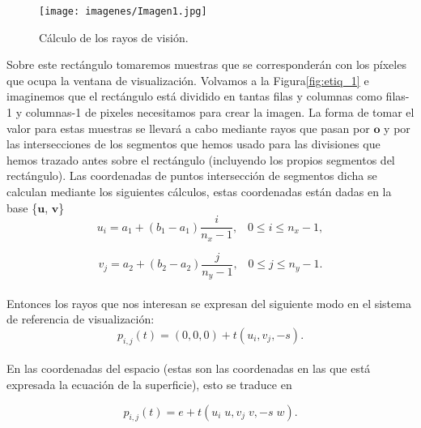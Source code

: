 \begin{figure}
	\begin{center}
		\texttt{[image: imagenes/Imagen1.jpg]}
	\end{center}
	\caption{Cálculo de los rayos de visión.}
	\label{fig:etiq_3}
\end{figure}




Sobre este rectángulo tomaremos muestras que se corresponderán con los píxeles que ocupa la ventana de visualización. Volvamos a la Figura\ref{fig:etiq_1} e imaginemos que el rectángulo está dividido en tantas filas y columnas como filas-1 y columnas-1 de pixeles necesitamos para crear la imagen. La forma de tomar el valor para estas muestras se llevará a cabo mediante rayos que pasan por $\textbf{o}$ y por las intersecciones de los segmentos que hemos usado para las divisiones que hemos trazado antes sobre el rectángulo (incluyendo los propios segmentos del rectángulo). Las coordenadas de puntos intersección de segmentos dicha se calculan mediante los siguientes cálculos, estas coordenadas están dadas en la base \{$\textbf{u}$, $\textbf{v}$\}
${ }$\\


\[
	u_i = a_1 + (b_1-a_1) \frac{i}{n_x-1}, \;\;\; 0 \leq i \leq n_x -1,
\]

\[
	v_j = a_2 + (b_2-a_2) \frac{j}{n_y-1}, \;\;\; 0 \leq j \leq n_y -1.
\]
${ }$\\

Entonces los rayos que nos interesan se expresan del siguiente modo en el sistema de referencia de visualización:
${ }$\\

\[
	p_{i,j}(t) = (0,0,0) + t(u_i , v_j, -s).
\]
${ }$\\

En las coordenadas del espacio (estas son las coordenadas en las que está expresada la ecuación de la superficie), esto se traduce en 

\[
	p_{i,j}(t) = e + t( u_i \; u, v_j \; v, -s \; w).
\]

